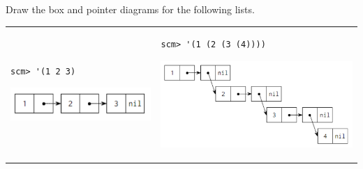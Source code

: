 \documentclass{exam}
\begin{document}
\begin{questions}
\item Draw the box and pointer diagrams for the following lists.

\begin{tabular}{m{7cm} m{6cm}}
\begin{lstlisting}
scm> '(1 2 3)
\end{lstlisting}
\begin{solution}
\begin{center}
 \includegraphics[scale=0.7]{bp1}
\end{center}
\end{solution}
&
\begin{lstlisting}
scm> '(1 (2 (3 (4))))
\end{lstlisting}
\begin{solution}
\begin{center}
 \includegraphics[scale=0.7]{bp2}
\end{center}
\end{solution}
\end{tabular}
\end{questions}
\end{document}
